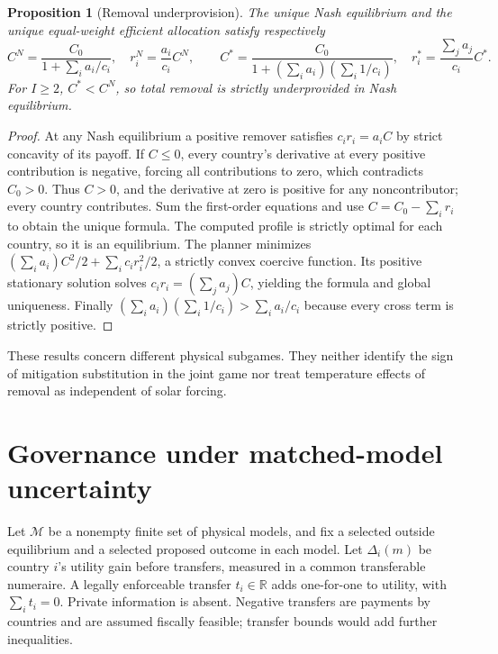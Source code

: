 \documentclass[11pt]{article}
\newtheorem{proposition}{Proposition}
\theoremstyle{definition}
\begin{document}
\begin{proposition}[Removal underprovision]
The unique Nash equilibrium and the unique equal-weight efficient allocation satisfy respectively
\[
 C^N=\frac{C_0}{1+\sum_i a_i/c_i},\quad r_i^N=\frac{a_i}{c_i}C^N,
 \qquad
 C^*=\frac{C_0}{1+(\sum_i a_i)(\sum_i1/c_i)},\quad
 r_i^*=\frac{\sum_j a_j}{c_i}C^*.
\]
For $I\geq2$, $C^*<C^N$, so total removal is strictly underprovided in Nash equilibrium.
\end{proposition}
\begin{proof}
At any Nash equilibrium a positive remover satisfies $c_i r_i=a_i C$ by strict concavity of its payoff. If $C\leq0$, every country's derivative at every positive contribution is negative, forcing all contributions to zero, which contradicts $C_0>0$. Thus $C>0$, and the derivative at zero is positive for any noncontributor; every country contributes. Sum the first-order equations and use $C=C_0-\sum_i r_i$ to obtain the unique formula. The computed profile is strictly optimal for each country, so it is an equilibrium.
The planner minimizes $(\sum_i a_i)C^2/2+\sum_i c_i r_i^2/2$, a strictly convex coercive function. Its positive stationary solution solves $c_i r_i=(\sum_j a_j)C$, yielding the formula and global uniqueness. Finally $(\sum_i a_i)(\sum_i1/c_i)>\sum_i a_i/c_i$ because every cross term is strictly positive.
\end{proof}
These results concern different physical subgames. They neither identify the sign of mitigation substitution in the joint game nor treat temperature effects of removal as independent of solar forcing.

\section*{Governance under matched-model uncertainty}
Let $\mathcal M$ be a nonempty finite set of physical models, and fix a selected outside equilibrium and a selected proposed outcome in each model. Let $\Delta_i(m)$ be country $i$'s utility gain before transfers, measured in a common transferable numeraire. A legally enforceable transfer $t_i\in\mathbb R$ adds one-for-one to utility, with $\sum_i t_i=0$. Private information is absent. Negative transfers are payments by countries and are assumed fiscally feasible; transfer bounds would add further inequalities.
\end{document}
